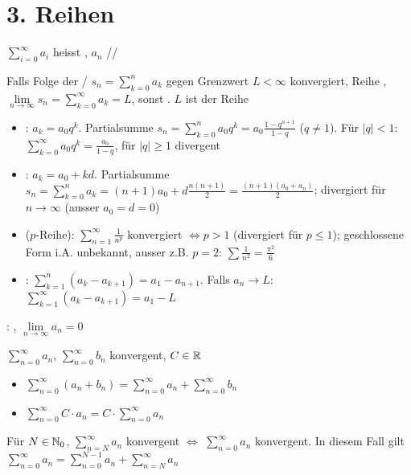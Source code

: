 \section{3. Reihen}

\Def $\sum_{i=0}^{\infty} a_i$ heisst ,
$a_n$ //

\Def Falls Folge der /
$s_n = \sum_{k=0}^{n} a_k$ gegen Grenzwert $L < \infty$ konvergiert,
Reihe , $\lim\limits_{n\to\infty} s_n = \sum_{k=0}^{\infty} a_k = L$,
sonst . $L$ ist  der Reihe

\Satz {}
\vspace{-0.6em}
\begin{itemize}
    \item {}: $a_k = a_0 q^k$. Partialsumme $s_n = \sum_{k=0}^{n} a_0 q^k = a_0\frac{1-q^{n+1}}{1-q}$ ($q\ne 1$).
    Für $|q|<1$: $\sum_{k=0}^{\infty} a_0 q^k = \frac{a_0}{1-q}$, für $|q|\ge 1$ divergent
    \item {}: $a_k = a_0 + kd$. Partialsumme
    $s_n = \sum_{k=0}^{n} a_k = (n+1)a_0 + d\frac{n(n+1)}{2} = \frac{(n+1)(a_0+a_n)}{2}$;
    divergiert für $n\to\infty$ (ausser $a_0=d=0$)
    \item {} ($p$-Reihe): $\sum_{n=1}^{\infty} \frac{1}{n^p}$ konvergiert $\iff p > 1$
    (divergiert für $p\le 1$); geschlossene Form i.A. unbekannt, ausser z.B. $p=2$: $\sum \frac{1}{n^2} = \frac{\pi^2}{6}$
    \item {}: $\sum_{k=1}^{n} (a_k - a_{k+1}) = a_1 - a_{n+1}$.
    Falls $a_n \to L$: $\sum_{k=1}^{\infty} (a_k - a_{k+1}) = a_1 - L$
\end{itemize}

\Satz {}: , $\lim\limits_{n\to\infty} a_n = 0$

\Satz $\sum_{n=0}^{\infty} a_n$, $\sum_{n=0}^{\infty} b_n$ konvergent, $C \in \mathbb{R}$
\vspace{-0.6em}
\begin{itemize}
    \item $\sum_{n=0}^{\infty} (a_n + b_n) = \sum_{n=0}^{\infty} a_n + \sum_{n=0}^{\infty} b_n$
    \item $\sum_{n=0}^{\infty} C \cdot a_n = C \cdot \sum_{n=0}^{\infty} a_n$
\end{itemize}

\Satz Für $N \in \mathbb{N}_0$, $\sum_{n=N}^{\infty} a_n$ konvergent $\iff$ $\sum_{n=0}^{\infty} a_n$ konvergent.
In diesem Fall gilt $\sum_{n=0}^{\infty} a_n = \sum_{n=0}^{N-1} a_n + \sum_{n=N}^{\infty} a_n$


